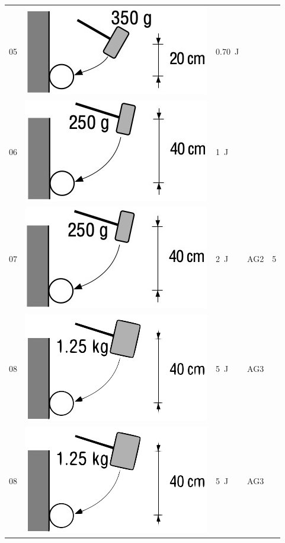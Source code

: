 \begin{minipage}[t]{0.59\linewidth}
\begin{table}[H]
\begin{threeparttable}
\begin{tabularx}{\linewidth}{p{0.5cm} m{3cm} J C C}
05 				& \includegraphics[scale=1]{K5.png}		& \SI{0,70}{\joule}	& 										& 								\\
06 				& \includegraphics[scale=1]{K6.png}		& \SI{1}{\joule}		& 										& 								\\
07 				& \includegraphics[scale=1]{K7.png}		& \SI{2}{\joule}		& 	AG2								& 5							\\
08 				& \includegraphics[scale=1]{K8.png}		& \SI{5}{\joule}		& 	AG3								& 								\\
08 				& \includegraphics[scale=1]{K8.png}		& \SI{5}{\joule}		& 	AG3								& 								\\

\end{tabularx}
\end{threeparttable}
\end{table}
\end{minipage}
